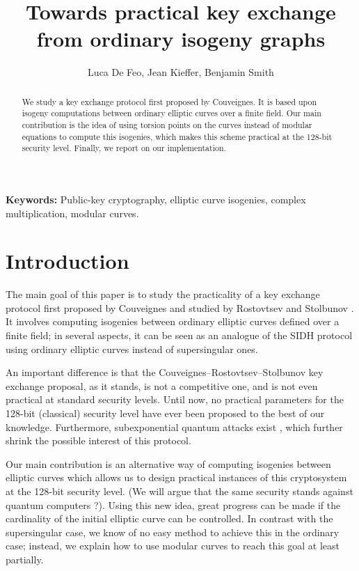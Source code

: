 \documentclass{article}
\title{Towards practical key exchange from ordinary isogeny graphs}
\author{Luca De Feo, Jean Kieffer, Benjamin Smith}
\theoremstyle{definition}
\begin{document}
\maketitle

\begin{abstract}
We study a key exchange protocol first proposed by Couveignes. It is
based upon isogeny computations between ordinary elliptic curves over
a finite field. Our main contribution is the idea of using torsion
points on the curves instead of modular equations to compute this
isogenies, which makes this scheme practical at the 128-bit
security level. Finally, we report on our implementation.
\end{abstract}

\textbf{Keywords:} Public-key cryptography, elliptic curve isogenies,
complex multiplication, modular curves.

\section{Introduction}

The main goal of this paper is to study the practicality of a key
exchange protocol first proposed by Couveignes \cite{} and studied
by Rostovtsev and Stolbunov \cite{}. It involves computing isogenies
between ordinary elliptic curves defined over a finite field; in
several aspects, it can be seen as an analogue of the SIDH
protocol \cite{} using ordinary elliptic curves instead of
supersingular ones.

An important difference is that the
Couveignes--Rostovtsev--Stolbunov key exchange proposal, as it stands,
is not a competitive one, and is not even practical at standard
security levels. Until now, no practical parameters for the
128-bit (classical) security level have ever been proposed to the best
of our knowledge. Furthermore, subexponential quantum attacks exist \cite{},
which further shrink the possible interest of this protocol.

Our main contribution is an alternative way of computing isogenies
between elliptic curves which allows us to design practical instances
of this cryptosystem at the 128-bit security level. (We will argue that
the same security stands against quantum computers ?). Using this
new idea, great progress can be made if the cardinality of the initial
elliptic curve can be controlled. In contrast with the supersingular
case, we know of no easy method to achieve this in the ordinary case;
instead, we explain how to use modular curves to reach this goal at
least partially.
\end{document}
